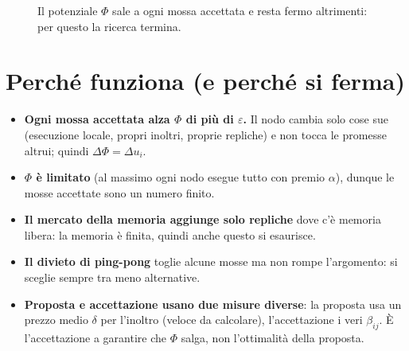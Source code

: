 \documentclass[11pt,a4paper]{article}
\newcommand{\Phiv}{\Phi}
\begin{document}
\begin{figure}[ht]
\centering
{}
\caption{Il potenziale $\Phiv$ sale a ogni mossa accettata e resta fermo
altrimenti: per questo la ricerca termina.}
\end{figure}

\section{Perch\'e funziona (e perch\'e si ferma)}

\begin{itemize}
\item \textbf{Ogni mossa accettata alza $\Phiv$ di pi\`u di $\varepsilon$.}
  Il nodo cambia solo cose sue (esecuzione locale, propri inoltri, proprie
  repliche) e non tocca le promesse altrui; quindi $\Delta\Phiv = \Delta u_i$.
\item \textbf{$\Phiv$ \`e limitato} (al massimo ogni nodo esegue tutto con
  premio $\alpha$), dunque le mosse accettate sono un numero finito.
\item \textbf{Il mercato della memoria aggiunge solo repliche} dove c'\`e
  memoria libera: la memoria \`e finita, quindi anche questo si esaurisce.
\item \textbf{Il divieto di ping-pong} toglie alcune mosse ma non rompe
  l'argomento: si sceglie sempre tra meno alternative.
\item \textbf{Proposta e accettazione usano due misure diverse}: la
  proposta usa un prezzo medio $\delta$ per l'inoltro (veloce da calcolare),
  l'accettazione i veri $\beta_{ij}$. \`E l'accettazione a garantire che
  $\Phiv$ salga, non l'ottimalit\`a della proposta.
\end{itemize}
\end{document}
